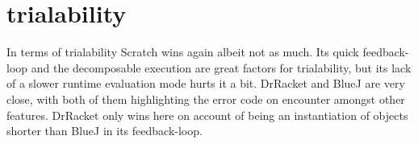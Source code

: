 \section{trialability}
\label{sec:trialability}
In terms of trialability Scratch wins again albeit not as much.
Its quick feedback-loop and the decomposable execution are great factors for trialability, but its lack of a slower runtime evaluation mode hurts it a bit.
DrRacket and BlueJ are very close, with both of them highlighting the error code on encounter amongst other features.
DrRacket only wins here on account of being an instantiation of objects shorter than BlueJ in its feedback-loop.